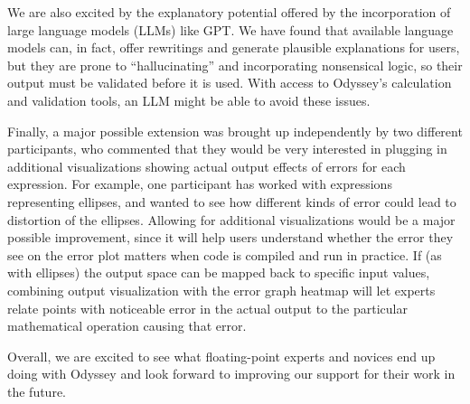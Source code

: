 We are also excited by the explanatory potential offered by the incorporation
  of large language models (LLMs) like GPT.
We have found that available language models can, in fact, offer rewritings and
  generate plausible explanations for users, but they are prone to
  “hallucinating” and incorporating nonsensical logic, so their output must be
  validated before it is used.
With access to Odyssey's calculation and validation tools, 
  an LLM might be able to avoid these issues.

Finally, a major possible extension was brought up independently by two
  different participants, who commented that they would be very interested in
  plugging in additional visualizations showing actual output effects of errors
  for each expression.
For example, one participant has worked with expressions representing ellipses,
  and wanted to see how different kinds of error could lead to distortion of the
  ellipses.
Allowing for additional visualizations would be a major possible improvement,
  since it will help users understand whether the error they see on the error
  plot matters when code is compiled and run in practice.
If (as with ellipses) the output space can be mapped back to specific input
  values, combining output visualization with the error graph heatmap will let
  experts relate points with noticeable error in the actual output to the
  particular mathematical operation causing that error.

Overall, we are excited to see what floating-point experts and novices
  end up doing with Odyssey 
  and look forward to improving our support 
  for their work in the future.
